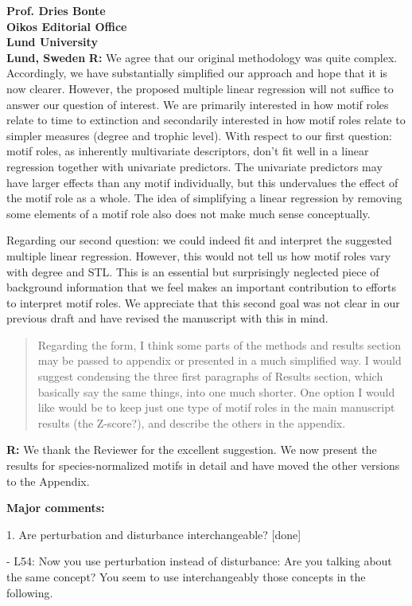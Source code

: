 \documentclass[12pt]{letter}
\begin{document}
\begin{letter}{\bf Prof. Dries Bonte\\
Oikos Editorial Office \\
Lund University \\
Lund, Sweden}
  \textbf{R:} We agree that our original methodology was quite complex. 
  Accordingly, we have substantially simplified our approach and hope that it is now clearer.
  However, the proposed multiple linear regression will not suffice to answer our question of interest. We are primarily interested in how motif roles relate to time to extinction and secondarily interested in how motif roles relate to simpler measures (degree and trophic level). With respect to our first question: motif roles, as inherently multivariate descriptors, don't fit well in a linear regression together with univariate predictors. The univariate predictors may have larger effects than any motif individually, but this undervalues the effect of the motif role as a whole. The idea of simplifying a linear regression by removing some elements of a motif role also does not make much sense conceptually.


  Regarding our second question: we could indeed fit and interpret the suggested multiple linear regression. However, this would not tell us how motif roles vary with degree and STL. This is an essential but surprisingly neglected piece of background information that we feel makes an important contribution to efforts to interpret motif roles.
  We appreciate that this second goal was not clear in our previous draft and have revised the manuscript with this in mind.


  \begin{quotation}
  Regarding the form, I think some parts of the methods and results section may be passed to appendix or presented in a much simplified way. I would suggest condensing the three first paragraphs of Results section, which basically say the same things, into one much shorter. One option I would like would be to keep just one type of motif roles in the main manuscript results (the Z-score?), and describe the others in the appendix.
  \end{quotation}


  \textbf{R:}  We thank the Reviewer for the excellent suggestion. We now present the results for species-normalized motifs in detail and have moved the other versions to the Appendix.


  \textbf{Major comments:}

    1. Are perturbation and disturbance interchangeable? [done]

      - L54: Now you use perturbation instead of disturbance: Are you talking about the same concept? You seem to use interchangeably those concepts in the following.


\end{letter}
\end{document}
